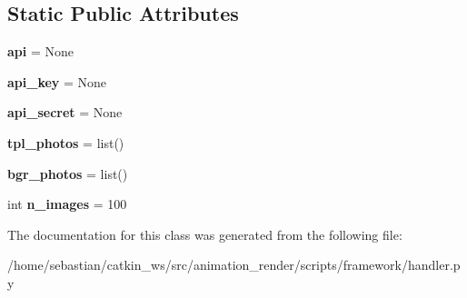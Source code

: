 \subsection*{Static Public Attributes}
\begin{DoxyCompactItemize}
\item 
{\bfseries api} = None\hypertarget{classframework_1_1handler_1_1ImageHandler_a86dde1ca5b4ecfe2968ac3f246097fea}{}\label{classframework_1_1handler_1_1ImageHandler_a86dde1ca5b4ecfe2968ac3f246097fea}

\item 
{\bfseries api\+\_\+key} = None\hypertarget{classframework_1_1handler_1_1ImageHandler_a362797523d6c9a2a29afa3c15347c3ae}{}\label{classframework_1_1handler_1_1ImageHandler_a362797523d6c9a2a29afa3c15347c3ae}

\item 
{\bfseries api\+\_\+secret} = None\hypertarget{classframework_1_1handler_1_1ImageHandler_a5766f50fd18d6d26cabc633ff9265288}{}\label{classframework_1_1handler_1_1ImageHandler_a5766f50fd18d6d26cabc633ff9265288}

\item 
{\bfseries tpl\+\_\+photos} = list()\hypertarget{classframework_1_1handler_1_1ImageHandler_a86f400d5dc00384ea4e689c9f0f2a337}{}\label{classframework_1_1handler_1_1ImageHandler_a86f400d5dc00384ea4e689c9f0f2a337}

\item 
{\bfseries bgr\+\_\+photos} = list()\hypertarget{classframework_1_1handler_1_1ImageHandler_a77d7b13fafe47b8ef63aca1d981557b6}{}\label{classframework_1_1handler_1_1ImageHandler_a77d7b13fafe47b8ef63aca1d981557b6}

\item 
int {\bfseries n\+\_\+images} = 100\hypertarget{classframework_1_1handler_1_1ImageHandler_ab73d3eb32f34dec641f79b420db358f4}{}\label{classframework_1_1handler_1_1ImageHandler_ab73d3eb32f34dec641f79b420db358f4}

\end{DoxyCompactItemize}


The documentation for this class was generated from the following file\+:\begin{DoxyCompactItemize}
\item 
/home/sebastian/catkin\+\_\+ws/src/animation\+\_\+render/scripts/framework/handler.\+py\end{DoxyCompactItemize}
